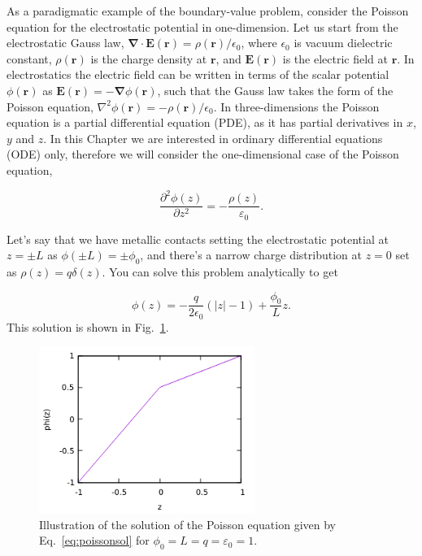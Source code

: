 As a paradigmatic example of the boundary-value problem, consider the Poisson equation for the electrostatic potential in one-dimension. Let us start from the electrostatic Gauss law, $\bm{\nabla}\cdot\bm{E}(\bm{r}) = \rho(\bm{r})/\epsilon_0$, where $\epsilon_0$ is vacuum dielectric constant, $\rho(\bm{r})$ is the charge density at $\bm{r}$, and $\bm{E}(\bm{r})$ is the electric field at $\bm{r}$. In electrostatics the electric field can be written in terms of the scalar potential $\phi(\bm{r})$ as $\bm{E}(\bm{r}) = -\bm{\nabla}\phi(\bm{r})$, such that the Gauss law takes the form of the Poisson equation, $\nabla^2 \phi(\bm{r}) = -\rho(\bm{r})/\epsilon_0$. In three-dimensions the Poisson equation is a partial differential equation (PDE), as it has partial derivatives in $x$, $y$ and $z$. In this Chapter we are interested in ordinary differential equations (ODE) only, therefore we will consider the one-dimensional case of the Poisson equation,

\begin{equation}
 \dfrac{\partial^2 \phi(z)}{\partial z^2} = -\dfrac{\rho(z)}{\varepsilon_0}.
 \label{eq:poisson}
\end{equation}

Let's say that we have metallic contacts setting the electrostatic potential at $z = \pm L$ as $\phi(\pm L) = \pm \phi_0$, and there's a narrow charge distribution at $z = 0$ set as $\rho(z) = q\delta(z)$. You can solve this problem analytically to get

\begin{equation}
 \phi(z) = -\dfrac{q}{2\epsilon_0}(|z|-1) + \dfrac{\phi_0}{L}z.
 \label{eq:poissonsol}
\end{equation}
This solution is shown in Fig.~\ref{fig:poisson}.

\begin{figure}[ht!]
 \centering
 \includegraphics[width=7cm,keepaspectratio=true]{./Poisson.png}
 \caption{Illustration of the solution of the Poisson equation given by Eq.~\eqref{eq:poissonsol} for $\phi_0 = L = q = \varepsilon_0 = 1$.}
 \label{fig:poisson}
\end{figure}

